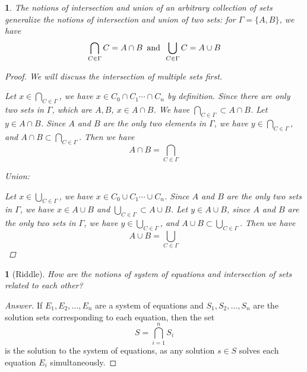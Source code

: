 \documentclass{book}
\newtheorem{majorEx}{}[section]
\newtheorem{minorEx}{}[section]
\begin{document}
            \begin{majorEx}%
            The notions of intersection and union of an arbitrary collection of sets generalize the notions of intersection and union of two sets: for $\Gamma = \{A, B\}$, we have 
            $$\bigcap_{C \in \Gamma} C = A \cap B \hspace{5pt} \text{\normalfont and} \hspace{5pt} \bigcup_{C \in \Gamma} C = A \cup B$$
            \begin{proof}
            
            We will discuss the intersection of multiple sets first.
            
            Let $x \in \bigcap_{C \in \Gamma}$, we have $x \in C_0 \cap C_1 \cdots \cap C_n$ by definition. Since there are only two sets in $\Gamma$, which are $A, B$, $x \in A \cap B$. We have $\bigcap_{C \in \Gamma} \subset A \cap B$. Let $y \in A \cap B$. Since $A$ and $B$ are the only two elements in $\Gamma$, we have $y \in \bigcap_{C \in \Gamma}$, and $A \cap B \subset \bigcap_{C \in \Gamma}$. Then we have $$A \cap B = \bigcap_{C \in \Gamma}$$
            
            Union:
            
            Let $x \in \bigcup_{C \in \Gamma}$, we have $x \in C_0 \cup C_1 \cdots \cup C_n$. Since $A$ and $B$ are the only two sets in $\Gamma$, we have $x \in A \cup B$ and $\bigcup_{C \in \Gamma} \subset A \cup B$. Let $y \in A \cup B$, since $A$ and $B$ are the only two sets in $\Gamma$, we have $y \in \bigcup_{C \in \Gamma}$, and $A \cup B \subset \bigcup_{C \in \Gamma}$. Then we have $$A \cup B = \bigcup_{C \in \Gamma}$$
            \end{proof}
            
			\end{majorEx}
            
            \begin{minorEx}%
				[Riddle]
                How are the notions of system of equations and intersection of sets related to each other?
			\end{minorEx}
            \begin{proof}
            [Answer]
            If $E_1, E_2, \ldots, E_n$ are a system of equations and $S_1, S_2, \ldots, S_n$ are the solution sets corresponding to each equation, then the set
            \[
            S = \bigcap_{i=1}^{n} S_i
            \]
            is the solution to the system of equations, as any solution $s \in S$ solves each equation $E_i$ simultaneously.
\end{proof}
\end{document}
